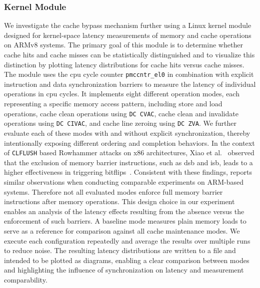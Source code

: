     \subsubsection{Kernel Module} \label{subsubsec:kernel-module}
        We investigate the cache bypass mechanism further using a Linux kernel module designed for kernel-space 
        latency measurements of memory and cache operations on ARMv8 systems. The primary goal of this module is 
        to determine whether cache hits and cache misses can be statistically distinguished and to visualize this 
        distinction by plotting latency distributions for cache hits versus cache misses.
        \\
        The module uses the \gls{cpu} cycle counter \texttt{pmccntr\_el0} in combination with explicit instruction and data 
        synchronization barriers to measure the latency of individual operations in \gls{cpu} cycles. It implements 
        eight different operation modes, each representing a specific memory access pattern, including store and 
        load operations, cache clean operations using \texttt{DC CVAC}, cache clean and invalidate operations using 
        \texttt{DC CIVAC}, and cache line zeroing using \texttt{DC ZVA}. We further evaluate each of these modes with and without 
        explicit synchronization, thereby intentionally exposing different ordering and completion behaviors. 
        In the context of \texttt{CLFLUSH} based Rowhammer attacks on x86 architectures, Xiao et al.~\cite{paperOneBitFlipsOneCouldFlops} observed 
        that the exclusion of memory barrier instructions, such as \gls{dsb} and \gls{isb}, leads to a higher effectiveness in triggering bitflips~\cite{paperTriggeringRHHardwareFault}. 
        Consistent with these findings, \cite{paperTriggeringRHHardwareFault} reports similar observations when conducting comparable experiments 
        on ARM-based systems. Therefore not all evaluated modes enforce full memory barrier instructions
        after memory operations. This design choice in our experiment enables an analysis of the latency 
        effects resulting from the absence versus the enforcement of such barriers. A baseline mode measures plain memory loads 
        to serve as a reference for comparison against all cache maintenance modes. We execute each configuration repeatedly and  
        average the results over multiple runs to reduce noise. The resulting latency distributions 
        are written to a file and intended to be plotted as diagrams, enabling a clear comparison between modes 
        and highlighting the influence of synchronization on latency and measurement comparability.
